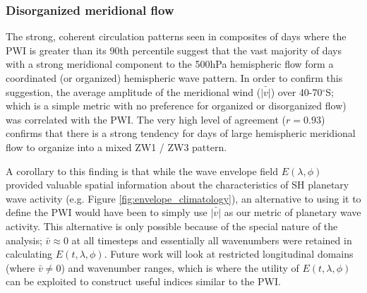 \subsubsection{Disorganized meridional flow}

The strong, coherent circulation patterns seen in composites of days where the PWI is greater than its 90th percentile suggest that the vast majority of days with a strong meridional component to the 500hPa hemispheric flow form a coordinated (or organized) hemispheric wave pattern. In order to confirm this suggestion, the average amplitude of the meridional wind ($\bar{\lvert v \rvert}$) over 40-70$^{\circ}$S; which is a simple metric with no preference for organized or disorganized flow) was correlated with the PWI. The very high level of agreement ($r = 0.93$) confirms that there is a strong tendency for days of large hemispheric meridional flow to organize into a mixed ZW1 / ZW3 pattern. 

A corollary to this finding is that while the wave envelope field $E(\lambda,\phi)$ provided valuable spatial information about the characteristics of SH planetary wave activity (e.g. Figure \ref{fig:envelope_climatology}), an alternative to using it to define the PWI would have been to simply use $\bar{\lvert v \rvert}$ as our metric of planetary wave activity. This alternative is only possible because of the special nature of the analysis; $\bar{v} \approx 0$ at all timesteps and essentially all wavenumbers were retained in calculating $E(t,\lambda,\phi)$. Future work will look at restricted longitudinal domains (where $\bar{v} \neq 0$) and wavenumber ranges, which is where the utility of $E(t,\lambda,\phi)$ can be exploited to construct useful indices similar to the PWI. 
